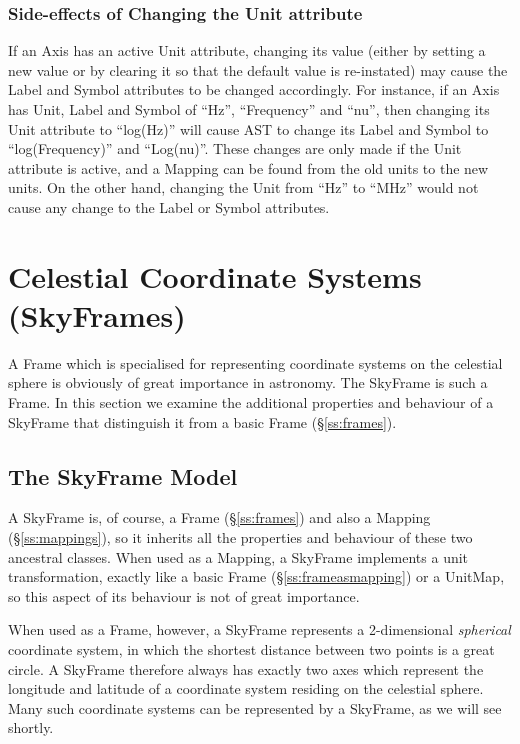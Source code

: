 \documentclass[twoside,11pt]{article}
\newcommand{\secref}[1]{\S\ref{#1}}
\newcommand{\secref}[1]{\ref{#1}}
\begin{document}
\subsubsection{Side-effects of Changing the Unit attribute}
If an Axis has an active Unit attribute, changing its value (either by 
setting a new value or by clearing it so that the default value is 
re-instated) may cause the Label and Symbol attributes to be changed
accordingly. For instance, if an Axis has Unit, Label and Symbol of ``Hz'',
``Frequency'' and ``nu'', then changing its Unit attribute to ``log(Hz)''
will cause AST to change its Label and Symbol to ``log(Frequency)'' and 
``Log(nu)''. These changes are only made if the Unit attribute is active,
and a Mapping can be found from the old units to the new units. On the other
 hand, changing the Unit from ``Hz'' to ``MHz'' would not cause any change 
to the Label or Symbol attributes.

\cleardoublepage
\section{\label{ss:skyframes}Celestial Coordinate Systems (SkyFrames)}

A Frame which is specialised for representing coordinate systems on
the celestial sphere is obviously of great importance in
astronomy. The SkyFrame is such a Frame. In this section we examine
the additional properties and behaviour of a SkyFrame that distinguish
it from a basic Frame (\secref{ss:frames}).

\subsection{The SkyFrame Model}

A SkyFrame is, of course, a Frame (\secref{ss:frames}) and also a
Mapping (\secref{ss:mappings}), so it inherits all the properties and
behaviour of these two ancestral classes.  When used as a Mapping, a
SkyFrame implements a unit transformation, exactly like a basic Frame
(\secref{ss:frameasmapping}) or a UnitMap, so this aspect of its
behaviour is not of great importance.

When used as a Frame, however, a SkyFrame represents a 2-dimensional
{\em{spherical}} coordinate system, in which the shortest distance
between two points is a great circle.  A SkyFrame therefore always has
exactly two axes which represent the longitude and latitude of a
coordinate system residing on the celestial sphere. Many such
coordinate systems can be represented by a SkyFrame, as we will see
shortly.
\end{document}
